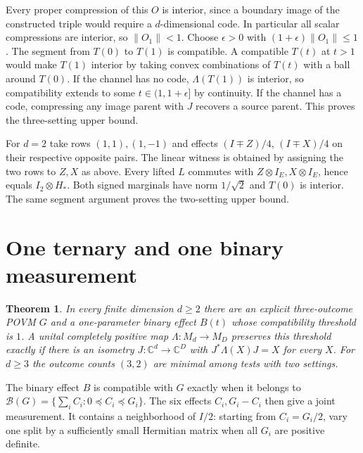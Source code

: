 \documentclass[10pt,a4paper]{article}
\newtheorem{theorem}{Theorem}
\newcommand{\C}{\mathbb C}
\begin{document}
Every proper compression of this \(O\) is interior, since a boundary image of the constructed triple would require a \(d\)-dimensional code. In particular all scalar compressions are interior, so \(\|O_1\|<1\). Choose \(\epsilon>0\) with \((1+\epsilon)\|O_1\|\le1\). The segment from \(T(0)\) to \(T(1)\) is compatible. A compatible \(T(t)\) at \(t>1\) would make \(T(1)\) interior by taking convex combinations of \(T(t)\) with a ball around \(T(0)\). If the channel has no code, \(\Lambda(T(1))\) is interior, so compatibility extends to some \(t\in(1,1+\epsilon]\) by continuity. If the channel has a code, compressing any image parent with \(J\) recovers a source parent. This proves the three-setting upper bound.

For \(d=2\) take rows \((1,1),(1,-1)\) and effects \((I\mp Z)/4\), \((I\mp X)/4\) on their respective opposite pairs. The linear witness is obtained by assigning the two rows to \(Z,X\) as above. Every lifted \(L\) commutes with \(Z\otimes I_E,X\otimes I_E\), hence equals \(I_2\otimes H_*\). Both signed marginals have norm \(1/\sqrt2\) and \(T(0)\) is interior. The same segment argument proves the two-setting upper bound.

\section{One ternary and one binary measurement}
\begin{theorem}\label{thm:ternary}
In every finite dimension \(d\ge2\) there are an explicit three-outcome POVM
\(G\) and a one-parameter binary effect \(B(t)\) whose compatibility threshold
is \(1\). A unital completely positive map \(\Lambda:M_d\to M_D\) preserves this
threshold exactly if there is an isometry \(J:\C^d\to\C^D\) with
\(J^*\Lambda(X)J=X\) for every \(X\). For \(d\ge3\) the outcome counts
\((3,2)\) are minimal among tests with two settings.
\end{theorem}
The binary effect \(B\) is compatible with \(G\) exactly when it belongs to
\(\mathcal B(G)=\{\sum_i C_i:0\preceq C_i\preceq G_i\}\). The six effects
\(C_i,G_i-C_i\) then give a joint measurement. It contains a neighborhood of \(I/2\): starting from \(C_i=G_i/2\), vary one split by a sufficiently small Hermitian matrix when all \(G_i\) are positive definite.
\end{document}
